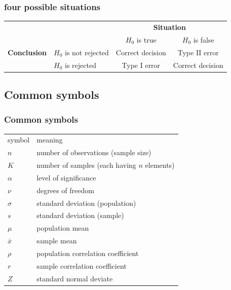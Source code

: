\documentclass[xcolor={table}]{beamer}
\begin{document}
\begin{frame}\frametitle{four possible situations}\footnotesize
\begin{tabular}{cl|c|c|}
  &  \multicolumn{1}{c}{}& \multicolumn{2}{c}{\textbf{Situation}} \\
  &  \multicolumn{1}{c}{}& \multicolumn{1}{c}{$H_0$ is true} & \multicolumn{1}{c}{$H_0$ is false} \\
\cline{3-4}
\textbf{Conclusion} & $H_0$ is not rejected &  Correct decision  & Type II error \\
\cline{3-4}
 & $H_0$ is rejected & Type I error &  Correct decision  \\
\cline{3-4}
\end{tabular}
\end{frame}

\subsection{Common symbols}
\begin{frame}\frametitle{Common symbols}
  \begin{tabular}{@{} >{\ttfamily}l l@{}} 
    \rowcolor{gray!40}symbol & meaning \\
    $n$ & number of observations (sample size)\\
    $K$ & number of samples (each having $n$ elements) \\
    $\alpha$ & level of significance \\
    $\nu$ & degrees of freedom \\
    $\sigma$ & standard deviation (population)\\
    $s$ & standard deviation (sample)\\
    $\mu$ & population mean \\
    $\bar{x}$ & sample mean \\
    $\rho $ & population correlation coefficient \\
    $r$ & sample correlation coefficient \\
    $Z$ & standard normal deviate \\
  \end{tabular}
\end{frame}
\end{document}
